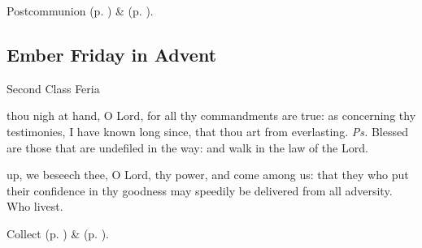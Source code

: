 \begin{rubric}
     Postcommunion  (p. \pageref{AdventIPostcommunion}) \&   (p. \pageref{SPMaryInAdvent}).
\end{rubric}


\subsection{Ember Friday in Advent}
\begin{inhead}
{Second Class Feria}
\end{inhead}


\introit
{} thou nigh at hand, O Lord, for all thy commandments are true: as concerning thy testimonies, I have known long since, that thou art from everlasting. \textit{Ps.} Blessed are those that are undefiled in the way: and walk in the law of the Lord.

\collect
{} up, we beseech thee, O Lord, thy power, and come among us: that they who put their confidence in thy goodness may speedily be delivered from all adversity. Who livest.

\begin{rubric}
     Collect  (p. \pageref{AdventICollect}) \&   (p. \pageref{SPMaryInAdvent}).
\end{rubric}

